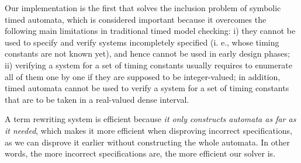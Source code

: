 \documentclass[acmsmall,review,anonymous]{acmart}\settopmatter{printfolios=true,printccs=false,printacmref=false}
\begin{document}
Our implementation is the first that solves the  inclusion problem of symbolic timed automata, which is considered important because it overcomes the following main limitations in traditional timed model checking:  i) they cannot be used to specify and verify systems incompletely specified (i. e., whose timing constants are not known yet), and hence cannot be used in early design phases; ii) verifying a system for a set of timing constants usually requires to enumerate all of them one by one if they are supposed to be integer-valued; in addition, timed automata cannot be used to verify a system for a set of timing constants that are to be taken in a real-valued dense interval. 



A term rewriting system is efficient because \emph{it only constructs automata as far as it needed}, which makes it more efficient when disproving incorrect specifications, as we can disprove it earlier without constructing the whole automata. In other words, the more incorrect specifications are, the more efficient our solver is.
\end{document}
